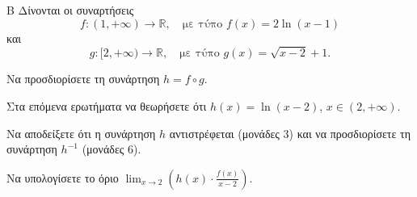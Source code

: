 \begin{thema}{Β}
Δίνονται οι συναρτήσεις
\begin{equation*}
f: (1, +\infty) \to \mathbb{R}, \quad \text{με τύπο } f(x) = 2 \ln(x - 1)
\end{equation*}
και
\begin{equation*}
g: [2, +\infty) \to \mathbb{R}, \quad \text{με τύπο } g(x) = \sqrt{x - 2} + 1.
\end{equation*}
\begin{erwthma}
\item Να προσδιορίσετε τη συνάρτηση $h = f \circ g$.

Στα επόμενα ερωτήματα να θεωρήσετε ότι $h(x) = \ln(x - 2)$, $x \in (2, +\infty)$.
\item Να αποδείξετε ότι η συνάρτηση $h$ αντιστρέφεται (μονάδες 3) και να προσδιορίσετε τη συνάρτηση $h^{-1}$ (μονάδες 6).
\item Να υπολογίσετε το όριο $\lim_{x \to 2} \left( h(x) \cdot \frac{f(x)}{x - 2} \right)$.
\end{erwthma}
\end{thema}

